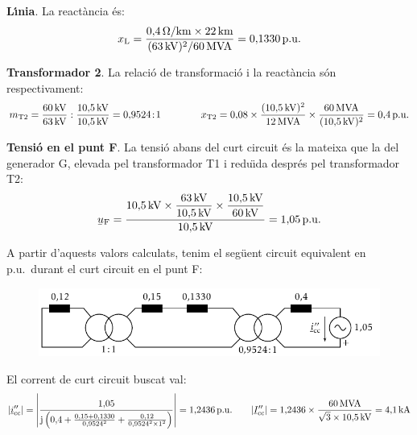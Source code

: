 \begin{exemple}
\textbf{L\'{\i}nia}. La react\`{a}ncia \'{e}s:
\[x_\mathrm{L} = \frac{0{,}4\mathrm{\,\mathrm{\Omega}/km} \times 22\mathrm{\,km}} {(63\mathrm{\,kV})^2/60\mathrm{\,MVA}}  = 0{,}1330\mathrm{\,p.u.}
\]

\textbf{Transformador 2}. La relaci\'{o} de transformaci\'{o} i la react\`{a}ncia s\'{o}n respectivament:
\[
m_\mathrm{T2} = \frac{60\mathrm{\,kV}}{63\mathrm{\,kV}} :
\frac{10{,}5\mathrm{\,kV}}{10{,}5\mathrm{\,kV}} = 0{,}9524\!:\!1 \qquad\qquad
x_\mathrm{T2} = 0{,}08 \times \frac{(10{,}5\mathrm{\,kV})^2}{12\mathrm{\,MVA}}
\times \frac{60\mathrm{\,MVA}}{(10{,}5\mathrm{\,kV})^2}  = 0{,}4\mathrm{\,p.u.}
\]

\textbf{Tensi\'{o} en el punt F}. La tensi\'{o} abans del curt circuit \'{e}s la mateixa que la del generador G, elevada pel transformador T1 i redu\"{\i}da despr\'{e}s pel transformador T2:
\[
\cmplx{u}\ped{F} = \frac{10{,}5\unit{kV} \times
\dfrac{63\unit{kV}}{10{,}5\unit{kV}} \times
\dfrac{10{,}5\unit{kV}}{60\unit{kV}}}{10{,}5\unit{kV}} =
1{,}05\unit{p.u.}
\]

A partir d'aquests valors calculats, tenim el seg\"{u}ent circuit equivalent en p.u.\ durant el
curt circuit en el punt F:
\begin{figure}[h]
\vspace{3mm} \centering
   \includegraphics{Imatges/Cap-Fonaments-pu-Circuit2.pdf}
\end{figure}


El corrent de curt circuit buscat val:
\[
|\cmplx{i}''\ped{cc}| = \left| \frac{1{,}05}{\ju \left( 0{,}4 + \frac{0{,}15 + 0{,}1330}{0{,}9524^2} + \frac{0{,}12}{0{,}9524^2 \times 1^2} \right)} \right| = 1{,}2436\unit{p.u.} \qquad |\cmplx{I}''\ped{cc}| = 1{,}2436\times\frac{60\unit{MVA}}{\sqrt{3}\times 10{,}5\unit{kV}} = 4{,}1\unit{kA}
\]


\end{exemple}
